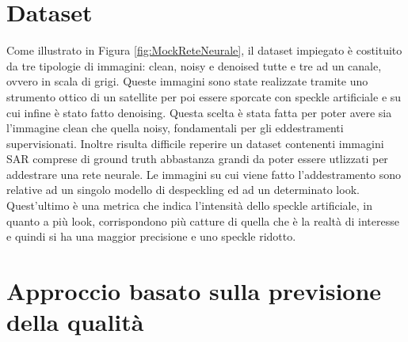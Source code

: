 \section{Dataset}

Come illustrato in Figura \ref{fig:MockReteNeurale}, il dataset impiegato è costituito da tre tipologie di 
immagini: clean, noisy e denoised tutte e tre ad un canale, ovvero in scala di grigi. Queste immagini sono state realizzate tramite uno strumento ottico di un
satellite per poi essere sporcate con speckle artificiale e su cui infine è stato fatto denoising. Questa scelta è stata fatta 
per poter avere sia l'immagine clean che quella noisy, fondamentali per gli eddestramenti supervisionati. Inoltre 
risulta difficile reperire un dataset contenenti immagini SAR comprese di ground truth abbastanza grandi da poter essere utlizzati per 
addestrare una rete neurale. Le immagini su cui viene fatto l'addestramento sono relative ad un singolo modello di despeckling ed ad 
un determinato look. Quest'ultimo è una metrica che indica l'intensità dello speckle artificiale, in quanto a più look,
corrispondono più catture di quella che è la realtà di interesse e quindi si ha una maggior precisione e uno speckle ridotto.


\section{Approccio basato sulla previsione della qualità}
